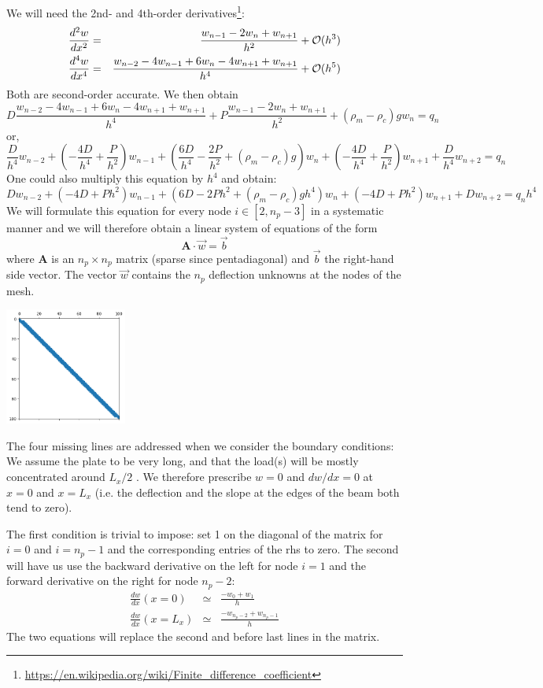 We will need the 2nd- and 4th-order derivatives\footnote{\url{https://en.wikipedia.org/wiki/Finite_difference_coefficient}}:
\begin{eqnarray}
\frac{d^2w}{dx^2} &=& \frac{w_{n-1}-2w_n+w_{n+1}}{h^2} 
+{\cal O}(h^3) \\
\frac{d^4w}{dx^4} &=& \frac{w_{n-2}-4w_{n-1}+6w_n-4w_{n+1}+w_{n+1}}{h^4}
+{\cal O}(h^5)
\end{eqnarray}
Both are second-order accurate.
We then obtain 
\[
D\frac{w_{n-2}-4w_{n-1}+6w_n-4w_{n+1}+w_{n+1}}{h^4}
+P\frac{w_{n-1}-2w_n+w_{n+1}}{h^2} 
+(\rho_m-\rho_c)g w_n = q_n
\]
or, 
\[
\boxed{
\frac{D}{h^4} w_{n-2}
+\left(-\frac{4D}{h^4}+\frac{P}{h^2}\right)w_{n-1}
+\left(\frac{6D}{h^4}-\frac{2P}{h^2} +(\rho_m-\rho_c)g \right)w_n
+\left(-\frac{4D}{h^4}+\frac{P}{h^2}\right)w_{n+1}
+\frac{D}{h^4} w_{n+2} = q_n
}
\]
One could also multiply this equation by $h^4$ and obtain:
\[
D w_{n-2}
+\left(-4D+Ph^2\right)w_{n-1}
+\left(6D-2Ph^2 +(\rho_m-\rho_c)g h^4 \right)w_n
+\left(-4D+Ph^2\right)w_{n+1}
+D w_{n+2} = q_n h^4
\]
We will formulate this equation for every node $i\in[2,n_p-3]$
in a systematic manner and we will therefore obtain a linear system of equations of the form 
\[
{\bm A} \cdot \vec{w} = \vec{b}
\]
where ${\bm A}$ is an $n_p\times n_p$ matrix (sparse since pentadiagonal) and $\vec{b}$ the right-hand side vector. 
The vector $\vec{w}$ contains the $n_p$ deflection unknowns at the nodes of the mesh.

\begin{center}
\includegraphics[width=4cm]{python_codes/fieldstone_105/images/matrix}
\end{center}

The four missing lines are addressed when we consider the boundary conditions:
We assume the plate to be very long, and that the load(s) will be mostly concentrated around $L_x/2$ . We therefore 
prescribe $w=0$ and $dw/dx=0$ at $x=0$ and $x=L_x$ (i.e. the deflection and the slope at the edges of the beam both tend to zero).

The first condition is trivial to impose: set 1 on the diagonal of the matrix for $i=0$ and $i=n_p-1$ and the corresponding entries of the rhs to zero. 
The second will have us use the backward derivative on the left for node $i=1$ and the forward derivative on the right for node $n_p-2$:
\begin{eqnarray}
\frac{dw}{dx} (x=0)   &\simeq& \frac{-w_0+w_1}{h} \nonumber\\
\frac{dw}{dx} (x=L_x) &\simeq& \frac{-w_{n_p-2}+w_{n_p-1}}{h}
\end{eqnarray}
The two equations will replace the second and before last 
lines in the matrix.

